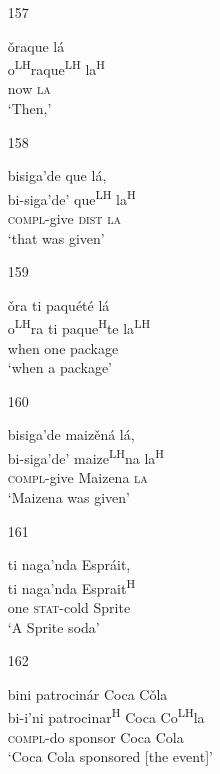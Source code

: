 \begin{itemize}
\item[157]
 
\glll   \v{o}raque l\'{a} \\
o\textsuperscript{LH}raque\textsuperscript{LH}  la\textsuperscript{H} \\
now \textsc{la}\\
\glt `Then,'
 


\item[158]
 
\glll  bisiga'de que l\'{a},\\
bi-siga'de' que\textsuperscript{LH} la\textsuperscript{H}\\
\textsc{compl}-give \textsc{dist} \textsc{la}\\
\glt `that was given'
 


\item[159]
 
\glll   \v{o}ra ti paqu\'{e}t\'{e} l\'{a}\\
o\textsuperscript{LH}ra ti paque\textsuperscript{H}te la\textsuperscript{LH} \\
when one package\\
\glt `when a package'
 


\item[160]
 
\glll   bisiga'de maiz\v{e}n\'{a} l\'{a}, \\
 bi-siga'de' maize\textsuperscript{LH}na la\textsuperscript{H}\\
\textsc{compl}-give Maizena \textsc{la}\\
\glt `Maizena was given'
 


\item[161]
 
\glll  ti naga'nda Espr\'{a}it, \\
ti naga'nda Esprait\textsuperscript{H}\\
one \textsc{stat}-cold Sprite\\
\glt `A Sprite soda'
 


\item[162]
 
\glll  bini patrocin\'{a}r Coca C\v{o}la\\
bi-i'ni patrocinar\textsuperscript{H} Coca Co\textsuperscript{LH}la\\
\textsc{compl}-do sponsor Coca Cola\\
\glt `Coca Cola sponsored [the event]'
 



\end{itemize}

